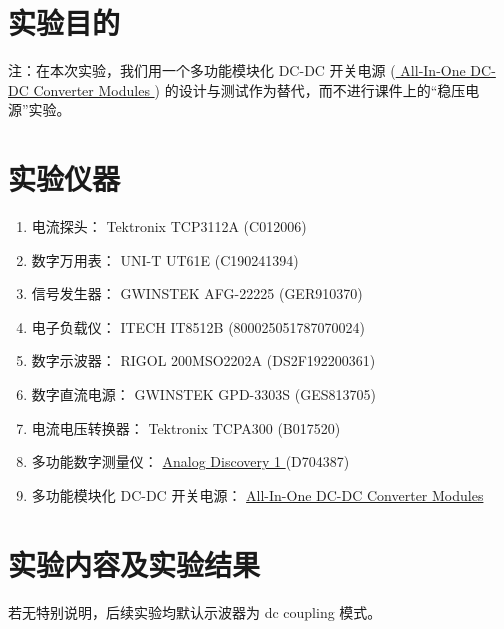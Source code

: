 \documentclass[UTF8]{article}
\begin{document}
\section{实验目的}

\vspace*{-3mm}
\begin{redbox}
    注：在本次实验，我们用一个多功能模块化 DC-DC 开关电源 (\href{https://yidingg.github.io/YiDingg/#/ElectronicDesigns/DC-DC\%20Converter\%20Modules
    }{ %
    All-In-One DC-DC Converter Modules
    }) 的设计与测试作为替代，而不进行课件上的``稳压电源''实验。
\end{redbox}


\section{实验仪器}

\begin{enumerate}
    \item 电流探头：  Tektronix TCP3112A (C012006)
    \item 数字万用表： UNI-T UT61E (C190241394)
    \item 信号发生器： GWINSTEK AFG-22225 (GER910370)
    \item 电子负载仪： ITECH IT8512B (800025051787070024)
    \item 数字示波器： RIGOL 200MSO2202A (DS2F192200361)
    \item 数字直流电源： GWINSTEK GPD-3303S (GES813705) 
    \item 电流电压转换器： Tektronix TCPA300 (B017520)
    \item 多功能数字测量仪： 
    \href{https://digilent.com/reference/test-and-measurement/analog-discovery/start
    }{ %
    Analog Discovery 1
    } 
    (D704387)
    \item 多功能模块化 DC-DC 开关电源：
    \href{https://yidingg.github.io/YiDingg/#/ElectronicDesigns/DC-DC\%20Converter\%20Modules
    }{ %
    All-In-One DC-DC Converter Modules
    }
\end{enumerate}


\section{实验内容及实验结果}

\vspace*{-3mm}
\begin{redbox}
    若无特别说明，后续实验均默认示波器为 dc coupling 模式。
\end{redbox}
\end{document}
